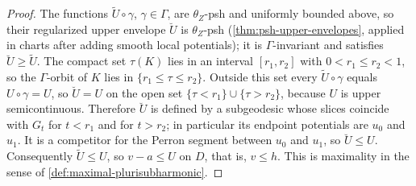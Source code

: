 \begin{proof}
The functions $\widetilde U\circ\gamma$, $\gamma\in\Gamma$, are $\theta_Z$-psh and uniformly bounded above, so their regularized upper envelope $\breve U$ is $\theta_Z$-psh (\cref{thm:psh-upper-envelopes}, applied in charts after adding smooth local potentials); it is $\Gamma$-invariant and satisfies $\breve U\geq\widetilde U$. The compact set $\tau(K)$ lies in an interval $[r_1,r_2]$ with $0<r_1\leq r_2<1$, so the $\Gamma$-orbit of $K$ lies in $\{r_1\leq\tau\leq r_2\}$. Outside this set every $\widetilde U\circ\gamma$ equals $U\circ\gamma=U$, so $\breve U=U$ on the open set $\{\tau<r_1\}\cup\{\tau>r_2\}$, because $U$ is upper semicontinuous. Therefore $\breve U$ is defined by a subgeodesic whose slices coincide with $G_t$ for $t<r_1$ and for $t>r_2$; in particular its endpoint potentials are $u_0$ and $u_1$. It is a competitor for the Perron segment between $u_0$ and $u_1$, so $\breve U\leq U$. Consequently $\widetilde U\leq U$, so $v-a\leq U$ on $D$, that is, $v\leq h$. This is maximality in the sense of \cref{def:maximal-plurisubharmonic}.
\end{proof}

